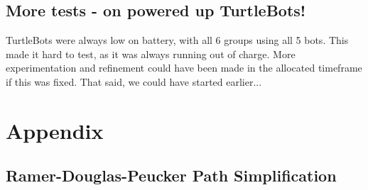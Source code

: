 \documentclass[titlepage,12pt,a4paper]{article}
\begin{document}
\subsection*{More tests - on powered up TurtleBots!}
TurtleBots were always low on battery, with all 6 groups using all 5 bots. This made it hard to test, as it was always running out of charge. More experimentation and refinement could have been made in the allocated timeframe if this was fixed. That said, we could have started earlier...

\pagebreak
\section{Appendix}

\subsection{Ramer-Douglas-Peucker Path Simplification}
\end{document}
